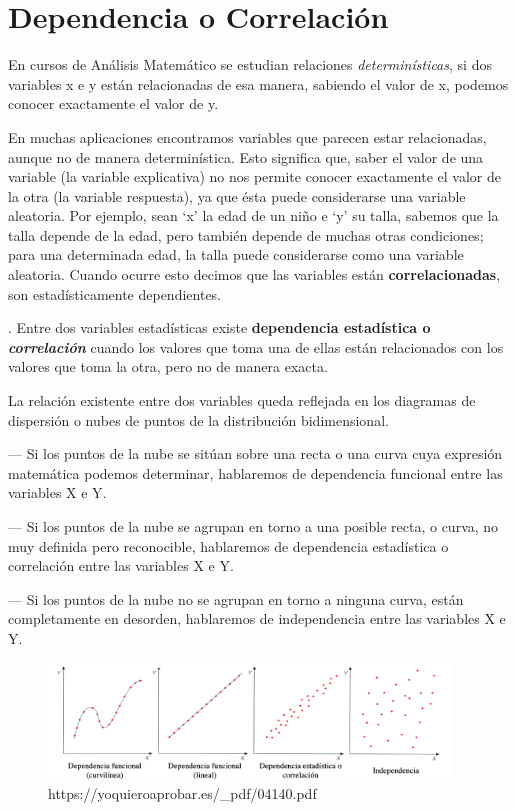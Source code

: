 \section{Dependencia o Correlación}


En cursos de Análisis Matemático se estudian relaciones \emph{determinísticas}, si dos variables x e y están relacionadas de esa manera, sabiendo el valor de x, podemos conocer exactamente el valor de y.

En muchas aplicaciones encontramos variables que parecen estar relacionadas, aunque no de manera determinística. Esto significa que, saber el valor de una variable (la variable explicativa) no nos permite conocer exactamente el valor de la otra (la variable respuesta), ya que  ésta puede considerarse una variable aleatoria. Por ejemplo, sean `x' la edad de un niño e `y' su talla, sabemos que la talla depende de la edad, pero también depende de muchas otras condiciones; para una determinada edad, la talla puede considerarse como una variable aleatoria. Cuando ocurre esto decimos que las variables están \textbf{correlacionadas}, son estadísticamente dependientes.

\begin{definition}
.	Entre dos variables estadísticas existe \textbf{dependencia estadística o \emph{correlación}} cuando los valores que toma una de ellas están relacionados con los valores que toma la otra, pero no de manera exacta.	

La relación existente entre dos variables queda reflejada en los diagramas de dispersión o nubes de puntos de la distribución bidimensional.

--- Si los puntos de la nube se sitúan sobre una recta o una curva cuya expresión matemática podemos determinar, hablaremos de dependencia funcional entre las variables X e Y.

--- Si los puntos de la nube se agrupan en torno a una posible recta, o curva, no muy definida pero reconocible, hablaremos de dependencia estadística o correlación entre las variables X e Y.

--- Si los puntos de la nube no se agrupan en torno a ninguna curva, están completamente en desorden, hablaremos de independencia entre las variables X e Y.

	\begin{figure}[H]
			\centering
			\includegraphics[width=0.95\textwidth]{imagenes/imagenes03/T03IM06.png}
			\caption*{\scriptsize{https://yoquieroaprobar.es/\_pdf/04140.pdf}}
	\end{figure}
	

\end{definition}

